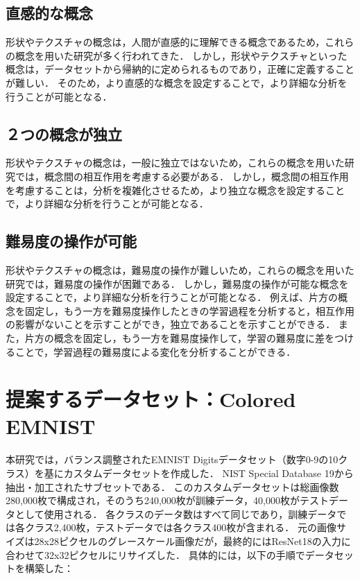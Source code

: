 \subsection{直感的な概念}
形状やテクスチャの概念は，人間が直感的に理解できる概念であるため，これらの概念を用いた研究が多く行われてきた．
しかし，形状やテクスチャといった概念は，データセットから帰納的に定められるものであり，正確に定義することが難しい．
そのため，より直感的な概念を設定することで，より詳細な分析を行うことが可能となる．

\subsection{２つの概念が独立}
形状やテクスチャの概念は，一般に独立ではないため，これらの概念を用いた研究では，概念間の相互作用を考慮する必要がある．
しかし，概念間の相互作用を考慮することは，分析を複雑化させるため，より独立な概念を設定することで，より詳細な分析を行うことが可能となる．

\subsection{難易度の操作が可能}
形状やテクスチャの概念は，難易度の操作が難しいため，これらの概念を用いた研究では，難易度の操作が困難である．
しかし，難易度の操作が可能な概念を設定することで，より詳細な分析を行うことが可能となる．
例えば、片方の概念を固定し，もう一方を難易度操作したときの学習過程を分析すると，相互作用の影響がないことを示すことができ，独立であることを示すことができる．
また，片方の概念を固定し，もう一方を難易度操作して，学習の難易度に差をつけることで，学習過程の難易度による変化を分析することができる．

\newpage

\section{提案するデータセット：Colored EMNIST}
本研究では，バランス調整されたEMNIST Digitsデータセット（数字0-9の10クラス）\cite{cohen2017emnist}を基にカスタムデータセットを作成した．
NIST Special Database 19から抽出・加工されたサブセットである．
このカスタムデータセットは総画像数280,000枚で構成され，そのうち240,000枚が訓練データ，40,000枚がテストデータとして使用される．
各クラスのデータ数はすべて同じであり，訓練データでは各クラス2,400枚，テストデータでは各クラス400枚が含まれる．
元の画像サイズは28x28ピクセルのグレースケール画像だが，最終的にはResNet18の入力に合わせて32x32ピクセルにリサイズした．
具体的には，以下の手順でデータセットを構築した：

